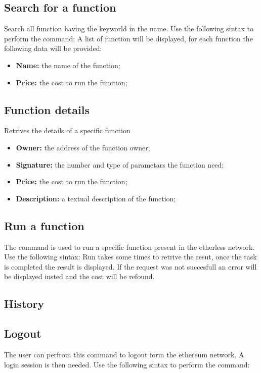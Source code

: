 \subsection{Search for a function}
Search all function having the keyworld in the name. Use the following sintax to perform the command:
\newline A list of function will be displayed, for each function the following data will be provided:
\begin{itemize}
	\item \textbf{Name: } the name of the function; 
	\item \textbf{Price: } the cost to run the function; 
\end{itemize} 

\subsection{Function details}
Retrives the details of a specific function
\begin{itemize}
	\item \textbf{Owner: } the address of the function owner; 
	\item \textbf{Signature: } the number and type of parametars the function need;  
	\item \textbf{Price: } the cost to run the function; 
	\item \textbf{Description: } a textual description of the function;  
\end{itemize}

\subsection{Run a function}
The command is used to run a specific function present in the etherless network. Use the following sintax:
\newline Run takes some times to retrive the resut, once the task is completed the result is displayed. If the request was not succesfull an error will be displayed insted and the cost will be refound.



\subsection{History}


\subsection{Logout}
The user can perfrom this command to logout form the ethereum network. A login session is then needed.
Use the following sintax to perform the command:
